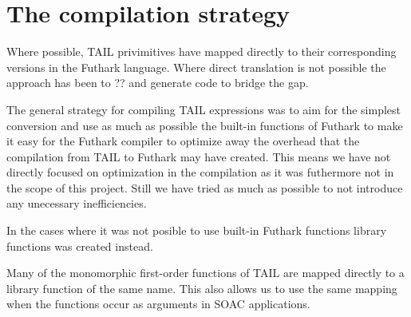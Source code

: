 \documentclass[11pt]{article}
\begin{document}



\section{The compilation strategy}
Where possible, TAIL privimitives have mapped directly to their corresponding versions in the Futhark language.
Where direct translation is not possible the approach has been to ?? and generate code to bridge the gap.



The general strategy for compiling TAIL expressions was to aim for the simplest conversion and use as much as possible 
the built-in functions of Futhark to make it easy for the Futhark compiler to optimize away the overhead that the compilation
from TAIL to Futhark may have created.
This means we have not directly focused on optimization in the compilation as it was futhermore not in the scope of this project.
Still we have tried as much as possible to not introduce any unecessary inefficiencies.

In the cases where it was not posible to use built-in Futhark functions library functions was created instead. 

Many of the monomorphic first-order functions of TAIL are mapped directly to a library function of the same name. This also allows us to use the same mapping when the functions occur as arguments in SOAC applications.

\end{document}

